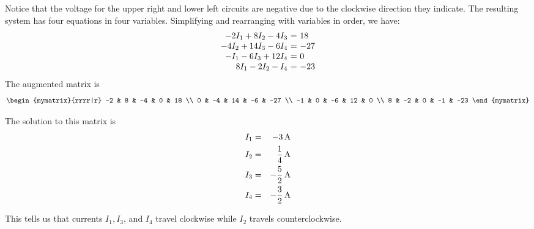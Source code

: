 \begin{solution}
  Notice that the voltage for the upper right and lower left circuits
  are negative due to the clockwise direction they indicate. The
  resulting system has four equations in four variables.  Simplifying
  and rearranging with variables in order, we have:
  \begin{equation*}
    \begin{array}{r@{~}c@{~}l}
      -2I_1+8I_2-4I_3&=&18 \\
      - 4I_2 + 14I_3 - 6I_4 &=& -27 \\
      -I_1 - 6I_3 + 12I_4 &=& 0 \\
      8I_1-2I_2 - I_4 &=& -23
    \end{array}
  \end{equation*}
  The augmented matrix is
  \begin{equation*}
    \begin{mymatrix}{rrrr|r}
      -2 & 8 & -4 & 0 & 18 \\
      0 & -4 & 14 & -6 & -27 \\
      -1 & 0 & -6 & 12 & 0 \\
      8 & -2 & 0 & -1 & -23
    \end{mymatrix}
  \end{equation*}

  The solution to this matrix is
  \begin{eqnarray*}
    I_1 &=& -3 \mathop{\textrm{\rm A}}\nolimits \\
    I_2 &=& \frac{1}{4} \mathop{\textrm{\rm A}}\nolimits \\
    I_3 &=& -\frac{5}{2} \mathop{\textrm{\rm A}}\nolimits \\
    I_4 &=& -\frac{3}{2} \mathop{\textrm{\rm A}}\nolimits
  \end{eqnarray*}

  This tells us that currents $I_1, I_3$, and $I_4$ travel clockwise
  while $I_2$ travels counterclockwise.
\end{solution}
